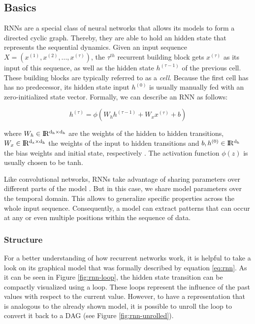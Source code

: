 \subsection{Basics}

RNNs are a special class of neural networks that allows its models to form a directed cyclic graph. Thereby, they are able to hold an hidden state that represents the sequential dynamics. Given an input sequence $ X = (x^{(1)}, x^{(2)},..., x^{(\tau)}) $, the $ \tau^{th} $ recurrent building block gets $x^{(\tau)}$ as its input of this sequence, as well as the hidden state $h^{(\tau-1)}$ of the previous cell. These building blocks are typically referred to as a \textit{cell}. Because the first cell has has no predecessor, its hidden state input $ h^{(0)} $ is usually manually fed with an zero-initialized state vector. Formally, we can describe an RNN as follows:

\begin{equation} \label{eq:rnn}
  h^{(\tau)} = \phi(W_{h} h^{(\tau-1)} + W_{x} x^{(\tau)} + b)
\end{equation}

where $ W_{h} \in \rm I\!R^{d_h \times d_h} $ are the weights of the hidden to hidden transitions, $ W_{x} \in \rm I\!R^{d_x \times d_h} $ the weights of the input to hidden transitions and $ b, h^{(0)} \in \rm I\!R^{d_h} $ the bias weights and initial state, respectively \parencite[p. 2]{rnn-batchnorm}. The activation function $ \phi(z) $ is usually chosen to be tanh.

Like convolutional networks, RNNs take advantage of sharing parameters over different parts of the model \parencite[p. 374]{deep_learning}. But in this case, we share model parameters over the temporal domain. This allows to generalize specific properties across the whole input sequence. Consequently, a model can extract patterns that can occur at any or even multiple positions within the sequence of data.

\subsubsection{Structure}

For a better understanding of how recurrent networks work, it is helpful to take a look on its graphical model that was formally described by equation \ref{eq:rnn}. As it can be seen in Figure \ref{fig:rnn-loop}, the hidden state transition can be compactly visualized using a loop. These loops represent the influence of the past values with respect to the current value. However, to have a representation that is analogous to the already shown model, it is possible to unroll the loop to convert it back to a DAG (see Figure \ref{fig:rnn-unrolled}).


